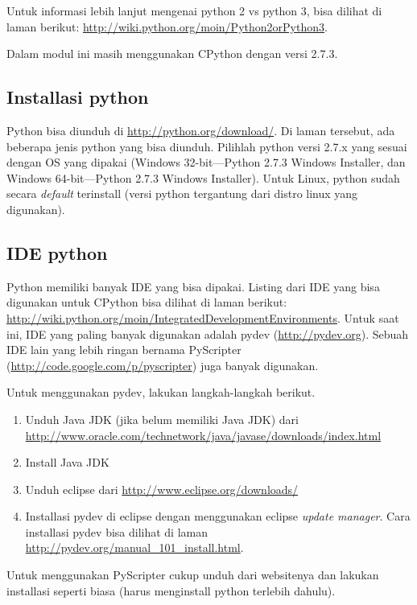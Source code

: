 Untuk informasi lebih lanjut mengenai python 2 vs python 3, bisa dilihat di laman berikut: \url{http://wiki.python.org/moin/Python2orPython3}.

Dalam modul ini masih menggunakan CPython dengan versi 2.7.3. 

\subsection{Installasi python}
Python bisa diunduh di \url{http://python.org/download/}. Di laman tersebut, ada beberapa jenis python yang bisa diunduh. Pilihlah python versi 2.7.x yang sesuai dengan OS yang dipakai (Windows 32-bit---Python 2.7.3 Windows Installer, dan Windows 64-bit---Python 2.7.3 Windows Installer). Untuk Linux, python sudah secara \textit{default} terinstall (versi python tergantung dari distro linux yang digunakan). 

\subsection{IDE python}
Python memiliki banyak IDE yang bisa dipakai. Listing dari IDE yang bisa digunakan untuk CPython bisa dilihat di laman berikut: 
\\\url{http://wiki.python.org/moin/IntegratedDevelopmentEnvironments}. Untuk saat ini, IDE yang paling banyak digunakan adalah pydev (\url{http://pydev.org}). Sebuah IDE lain yang lebih ringan bernama PyScripter \\(\url{http://code.google.com/p/pyscripter}) juga banyak digunakan. 

Untuk menggunakan pydev, lakukan langkah-langkah berikut.
\begin{enumerate}
	\item Unduh Java JDK (jika belum memiliki Java JDK) dari \\\url{http://www.oracle.com/technetwork/java/javase/downloads/index.html}
	\item Install Java JDK  
	\item Unduh eclipse dari \url{http://www.eclipse.org/downloads/}
	\item Installasi pydev di eclipse dengan menggunakan eclipse \textit{update manager}. Cara installasi pydev bisa dilihat di laman \\\url{http://pydev.org/manual_101_install.html}.
\end{enumerate}

Untuk menggunakan PyScripter cukup unduh dari websitenya dan lakukan installasi seperti biasa (harus menginstall python terlebih dahulu). 

